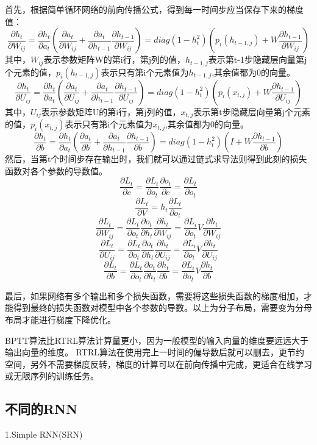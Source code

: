 \documentclass[openbib]{article}
\begin{document}
首先，根据简单循环网络的前向传播公式，得到每一时间步应当保存下来的梯度值：
$$\frac{\partial h_t}{\partial W_{ij}}=\frac{\partial h_t}{\partial a_t}(\frac{\partial a_t}{\partial W_{ij}}+\frac{\partial a_t}{\partial h_{t-1}}\frac{\partial h_{t-1}}{\partial W_{ij}})=diag(1-h_t^2)(p_i(h_{t-1,j})+W\frac{\partial h_{t-1}}{\partial W_{ij}})$$
其中，$W_{ij}$表示参数矩阵W的第i行，第j列的值，$h_{t-1,j}$表示第t-1步隐藏层向量第j个元素的值，$p_i(h_{t-1,j})$表示只有第i个元素值为$h_{t-1,j}$,其余值都为0的向量。
$$\frac{\partial h_t}{\partial U_{ij}}=\frac{\partial h_t}{\partial a_t}(\frac{\partial a_t}{\partial U_{ij}}+\frac{\partial a_t}{\partial h_{t-1}}\frac{\partial h_{t-1}}{\partial U_{ij}})=diag(1-h_t^2)(p_i(x_{t,j})+W\frac{\partial h_{t-1}}{\partial U_{ij}})$$
其中，$U_{ij}$表示参数矩阵U的第i行，第j列的值，$x_{t,j}$表示第t步隐藏层向量第j个元素的值，$p_i(x_{t,j})$表示只有第i个元素值为$x_{t,j}$,其余值都为0的向量。
$$\frac{\partial h_t}{\partial b}=\frac{\partial h_t}{\partial a_t}(\frac{\partial a_t}{\partial b}+\frac{\partial a_t}{\partial h_{t-1}}\frac{\partial h_{t-1}}{\partial b})=diag(1-h_t^2)(I+W\frac{\partial h_{t-1}}{\partial b})$$
然后，当第t个时间步存在输出时，我们就可以通过链式求导法则得到此刻的损失函数对各个参数的导数值。
$$\frac{\partial L_t}{\partial c}=\frac{\partial L_t}{\partial o_t}\frac{\partial o_t}{\partial c}=\frac{\partial L_t}{\partial o_t}$$
$$\frac{\partial L_t}{\partial V}=h_t\frac{\partial L_t}{\partial o_t}$$
$$\frac{\partial L_t}{\partial W_{ij}}=\frac{\partial L_t}{\partial o_t}\frac{\partial o_t}{\partial h_t}\frac{\partial h_t}{\partial W_{ij}}=\frac{\partial L_i}{\partial o_t}V\frac{\partial h_t}{\partial W_{ij}}$$
$$\frac{\partial L_t}{\partial U_{ij}}=\frac{\partial L_t}{\partial o_t}\frac{\partial o_t}{\partial h_t}\frac{\partial h_t}{\partial U_{ij}}=\frac{\partial L_i}{\partial o_t}V\frac{\partial h_t}{\partial U_{ij}}$$
$$\frac{\partial L_t}{\partial b}=\frac{\partial L_t}{\partial o_t}\frac{\partial o_t}{\partial h_t}\frac{\partial h_t}{\partial b}=\frac{\partial L_i}{\partial o_t}V\frac{\partial h_t}{\partial b}$$

最后，如果网络有多个输出和多个损失函数，需要将这些损失函数的梯度相加，才能得到最终的损失函数对模型中各个参数的导数。以上为分子布局，需要变为分母布局才能进行梯度下降优化。

BPTT算法比RTRL算法计算量更小，因为一般模型的输入向量的维度要远远大于输出向量的维度。
RTRL算法在使用完上一时间的偏导数后就可以删去，更节约空间，另外不需要梯度反转，梯度的计算可以在前向传播中完成，更适合在线学习或无限序列的训练任务。
\subsection{不同的RNN}
\begin{center}
	1.Simple RNN(SRN)
\end{center}
\end{document}
